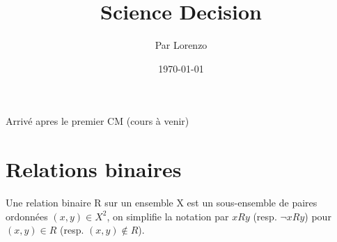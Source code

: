 \documentclass[a4paper, 12pt]{article}
\title{Science Decision}
\author{Par Lorenzo}
\date{\today}
\begin{document}
\maketitle

\tableofcontents



Arrivé apres le premier CM (cours à venir)





\section{Relations binaires}

\begin{definition}
    Une relation binaire R sur un ensemble X est un sous-ensemble de paires ordonnées $(x, y) \in X^2$,
    on simplifie la notation par $xRy$ (resp. $\neg xRy$) pour $(x, y) \in R$ (resp. $(x, y) \notin R$).
\end{definition}

\vspace{1em}
\end{document}

